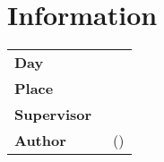 \restoregeometry

\chapter*{Information}
\label{chap:info}

\begin{tabular}{l l}

	{\textbf{Day}} \hspace{1cm} & \hspace{1cm} {\datum}\\[0,2cm]
	{\textbf{Place}} \hspace{1cm} & \hspace{1cm} {\platz}\\[0,2cm]
	{\textbf{Supervisor}} \hspace{1cm} & \hspace{1cm} {\betreuer}\\[1,2cm]
	{\textbf{Author}} \hspace{1cm} & \hspace{1cm} {\teilnehmerm~(\emailm)}\\

\end{tabular}